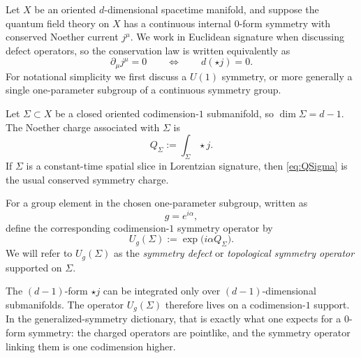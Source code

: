 \begin{assumption}\label{ass:zero-form-standing}
Let $X$ be an oriented $d$-dimensional spacetime manifold, and suppose the quantum field theory on $X$ has a continuous internal $0$-form symmetry with conserved Noether current $j^\mu$. We work in Euclidean signature when discussing defect operators, so the conservation law is written equivalently as
\begin{equation}\label{eq:noether-conservation-forms}
\partial_\mu j^\mu = 0
\qquad\Longleftrightarrow\qquad
d(\star j)=0.
\end{equation}
For notational simplicity we first discuss a $U(1)$ symmetry, or more generally a single one-parameter subgroup of a continuous symmetry group.
\end{assumption}

\begin{definition}\label{def:zero-form-charge}
Let $\Sigma \subset X$ be a closed oriented codimension-$1$ submanifold, so $\dim \Sigma = d-1$. The Noether charge associated with $\Sigma$ is
\begin{equation}\label{eq:QSigma}
Q_\Sigma := \int_\Sigma \star j.
\end{equation}
If $\Sigma$ is a constant-time spatial slice in Lorentzian signature, then \eqref{eq:QSigma} is the usual conserved symmetry charge.
\end{definition}

\begin{definition}\label{def:zero-form-defect}
For a group element in the chosen one-parameter subgroup, written as
\begin{equation*}
g=e^{i\alpha},
\end{equation*}
define the corresponding codimension-$1$ symmetry operator by
\begin{equation}\label{eq:UgSigma}
U_g(\Sigma) := \exp\!\bigl(i\alpha Q_\Sigma\bigr).
\end{equation}
We will refer to $U_g(\Sigma)$ as the \emph{symmetry defect} or \emph{topological symmetry operator} supported on $\Sigma$.
\end{definition}

\begin{remark}\label{rem:codim-one-zero-form}
The $(d-1)$-form $\star j$ can be integrated only over $(d-1)$-dimensional submanifolds. The operator $U_g(\Sigma)$ therefore lives on a codimension-$1$ support. In the generalized-symmetry dictionary, that is exactly what one expects for a $0$-form symmetry: the charged operators are pointlike, and the symmetry operator linking them is one codimension higher.
\end{remark}

